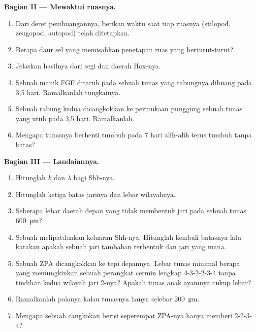 \begin{problem}
\medskip
\noindent\textbf{Bagian II --- Mewaktui ruasnya.}
\begin{enumerate}[resume]
  \item Dari deret pembuangannya, berikan waktu saat tiap ruasnya
        (stilopod, zeugopod, autopod) telah ditetapkan.
  \item Berapa daur sel yang memisahkan penetapan ruas yang
        berturut-turut?
  \item Jelaskan hasilnya dari segi  dan daerah
        Hox-nya.
  \item Sebuah manik FGF ditaruh pada sebuah tunas yang rabungnya
        dibuang pada 3,5 hari. Ramalkanlah tungkainya.
  \item Sebuah rabung kedua dicangkokkan ke permukaan punggung sebuah
        tunas yang utuh pada 3,5 hari. Ramalkanlah.
  \item Mengapa tunasnya berhenti tumbuh pada 7 hari alih-alih terus
        tumbuh tanpa batas?
\end{enumerate}

\medskip
\noindent\textbf{Bagian III --- Landaiannya.}
\begin{enumerate}[resume]
  \item Hitunglah $k$ dan $\lambda$ bagi Shh-nya.
  \item Hitunglah ketiga batas jarinya dan lebar wilayahnya.
  \item Seberapa lebar daerah depan yang tidak membentuk jari pada
        sebuah tunas \qty{600}{\micro m}?
  \item Sebuah  melipatduakan keluaran Shh-nya. Hitunglah kembali
        batasnya lalu katakan apakah sebuah jari tambahan terbentuk dan
        jari yang mana.
  \item Sebuah ZPA dicangkokkan ke tepi depannya. Lebar tunas minimal
        berapa yang memungkinkan sebuah perangkat cermin lengkap
        4-3-2-2-3-4 tanpa tindihan kedua wilayah jari 2-nya? Apakah
        tunas anak ayamnya cukup lebar?
  \item Ramalkanlah polanya kalau tunasnya hanya selebar
        \qty{200}{\micro m}.
  \item Mengapa sebuah cangkokan berisi seperempat ZPA-nya hanya
        memberi 2-2-3-4?
\end{enumerate}


\end{problem}
